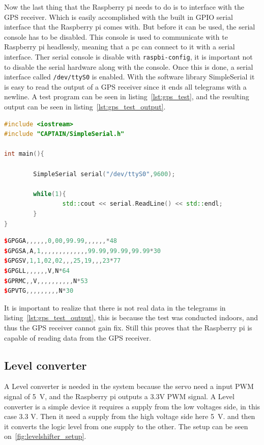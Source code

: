 Now the last thing that the Raspberry pi needs to do is to interface with the GPS receiver. Which is easily accomplished with the built in GPIO serial interface that the Raspberry pi comes with. But before it can be used, the serial console has to be disabled. This console is used to communicate with te Raspberry pi headlessly, meaning that a pc can connect to it with a serial interface. Ther serial console is disable with \texttt{raspbi-config}, it is important not to disable the serial hardware along with the console. Once this is done, a serial interface called \texttt{/dev/ttyS0} is enabled. With the software library SimpleSerial it is easy to read the output of a GPS receiver since it ends all telegrams with a newline. A test program can be seen in listing~\ref{lst:gps_test}, and the resulting output can be seen in listing~\ref{lst:gps_test_output}. 


\begin{lstlisting}[caption = {Test code to make the Raspberry pi output GPS receiver telegrams}, captionpos=b, label={lst:gps_test}, 
language=C++,firstnumber=1]
#include <iostream>
#include "CAPTAIN/SimpleSerial.h"

int main(){

        SimpleSerial serial("/dev/ttyS0",9600);

        while(1){
                std::cout << serial.ReadLine() << std::endl;
        }
}

\end{lstlisting}

\begin{lstlisting}[caption = {Output of the GPS test code}, captionpos=b, label={lst:gps_test_output}, 
language=C++,firstnumber=1]
$GPGGA,,,,,,0,00,99.99,,,,,,*48
$GPGSA,A,1,,,,,,,,,,,,,99.99,99.99,99.99*30
$GPGSV,1,1,02,02,,,25,19,,,23*77
$GPGLL,,,,,,V,N*64
$GPRMC,,V,,,,,,,,,,N*53
$GPVTG,,,,,,,,,N*30
\end{lstlisting}

It is important to realize that there is not real data in the telegrams in listing~\ref{lst:gps_test_output}, this is because the test was conducted indoors, and thus the GPS receiver cannot gain fix. Still this proves that the Raspberry pi is capable of reading data from the GPS receiver.



\subsection{Level converter}
A Level converter is needed in the system because the servo need a input PWM signal of 5~V, and the Raspberry pi outputs a 3.3V PWM signal. A Level converter is a simple device it requires a supply from the low voltages side, in this case 3.3 V. Then it need a supply from the high voltage side here 5~V. and then it converts the logic level from one supply to the other. The setup can be seen on~\ref{fig:levelshifter_setup}.

